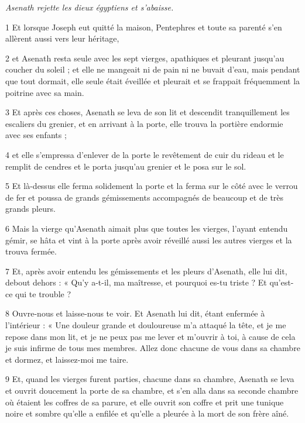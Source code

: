 \par \textit{Asenath rejette les dieux égyptiens et s'abaisse.}

\par 1 Et lorsque Joseph eut quitté la maison, Pentephres et toute sa parenté s'en allèrent aussi vers leur héritage,

\par 2 et Asenath resta seule avec les sept vierges, apathiques et pleurant jusqu'au coucher du soleil ; et elle ne mangeait ni de pain ni ne buvait d'eau, mais pendant que tout dormait, elle seule était éveillée et pleurait et se frappait fréquemment la poitrine avec sa main.

\par 3 Et après ces choses, Asenath se leva de son lit et descendit tranquillement les escaliers du grenier, et en arrivant à la porte, elle trouva la portière endormie avec ses enfants ;

\par 4 et elle s'empressa d'enlever de la porte le revêtement de cuir du rideau et le remplit de cendres et le porta jusqu'au grenier et le posa sur le sol.

\par 5 Et là-dessus elle ferma solidement la porte et la ferma sur le côté avec le verrou de fer et poussa de grands gémissements accompagnés de beaucoup et de très grands pleurs.

\par 6 Mais la vierge qu'Asenath aimait plus que toutes les vierges, l'ayant entendu gémir, se hâta et vint à la porte après avoir réveillé aussi les autres vierges et la trouva fermée.

\par 7 Et, après avoir entendu les gémissements et les pleurs d'Asenath, elle lui dit, debout dehors : « Qu'y a-t-il, ma maîtresse, et pourquoi es-tu triste ? Et qu'est-ce qui te trouble ?

\par 8 Ouvre-nous et laisse-nous te voir. Et Asenath lui dit, étant enfermée à l'intérieur : « Une douleur grande et douloureuse m'a attaqué la tête, et je me repose dans mon lit, et je ne peux pas me lever et m'ouvrir à toi, à cause de cela je suis infirme de tous mes membres. Allez donc chacune de vous dans sa chambre et dormez, et laissez-moi me taire.

\par 9 Et, quand les vierges furent parties, chacune dans sa chambre, Asenath se leva et ouvrit doucement la porte de sa chambre, et s'en alla dans sa seconde chambre où étaient les coffres de sa parure, et elle ouvrit son coffre et prit une tunique noire et sombre qu'elle a enfilée et qu'elle a pleurée à la mort de son frère aîné.

